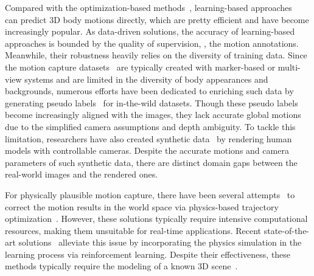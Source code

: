 \documentclass[10pt,twocolumn,letterpaper]{article}
\begin{document}
Compared with the optimization-based methods~\cite{sigal2008combined,guan2009estimating,bogo2016keep,lassner2017unite,huang2017towards,SMPL-X:2019,yi2022mover}, learning-based approaches~\cite{kanazawa2018end,kolotouros2019learning,zhang2021pymaf,pymafx2022} can predict 3D body motions directly, which are pretty efficient and have become increasingly popular.
As data-driven solutions, the accuracy of learning-based approaches is bounded by the quality of supervision, \ie, the motion annotations.
Meanwhile, their robustness heavily relies on the diversity of training data.
Since the motion capture datasets~\cite{ionescu2014human3, mehta2017monocular, sigal2010humaneva,huang2022capturing} are typically created with marker-based or multi-view systems and are limited in the diversity of body appearances and backgrounds, numerous efforts have been dedicated to enriching such data by generating pseudo labels~\cite{kolotouros2019learning,joo2021exemplar,moon2020neuralannot} for in-the-wild datasets.
Though these pseudo labels become increasingly aligned with the images, they lack accurate global motions due to the simplified camera assumptions and depth ambiguity.
To tackle this limitation, researchers have also created synthetic data~\cite{patel2021agora,bazavan2021hspace} by rendering human models with controllable cameras.
Despite the accurate motions and camera parameters of such synthetic data, there are distinct domain gaps between the real-world images and the rendered ones.



For physically plausible motion capture, there have been several attempts~\cite{rempe2021humor,yuan2021glamr} to correct the motion results in the world space via physics-based trajectory optimization~\cite{yuan2021glamr}.
However, these solutions typically require intensive computational resources, making them unsuitable for real-time applications.
Recent state-of-the-art solutions~\cite{yuan2021simpoe,luo2022embodied} alleviate this issue by incorporating the physics simulation in the learning process via reinforcement learning.
Despite their effectiveness, these methods typically require the modeling of a known 3D scene~\cite{yuan2021simpoe,luo2022embodied}.
\end{document}
